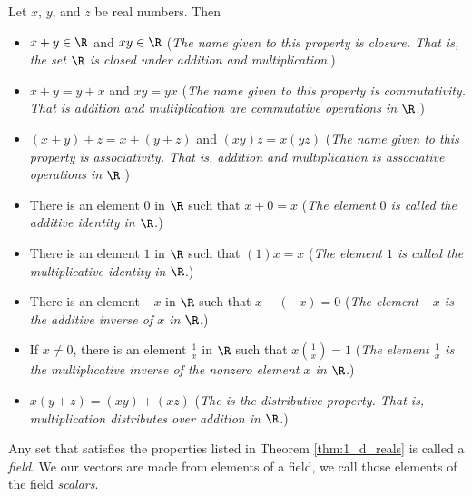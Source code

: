 \begin{theorem} \label{thm:1_d_reals} Let $x$, $y$, and $z$ be real numbers. Then
\begin{itemize}
\item $x + y \in \R$ and $xy \in \R$ (\emph{The name given to this property is closure. That is, the set $\R$ is closed under addition and multiplication.})
\item $x + y = y + x$ and $xy=yx$ (\emph{The name given to this property is commutativity. That is addition and multiplication are commutative operations in $\R$.})
\item $(x + y) + z = x + (y + z)$ and $(xy)z = x(yz)$ (\emph{The name given to this property is associativity. That is, addition and multiplication is associative operations in $\R$.})
\item There is an element $0$ in $\R$ such that $x+ 0 = x$ (\emph{The element $0$ is called the  additive identity in $\R$.}) 
\item There is an element $1$ in $\R$ such that $(1)x = x$ (\emph{The element $1$ is called the  multiplicative identity in $\R$.}) 
\item There is an element $-x$ in $\R$ such that $x+(-x) = 0$ (\emph{The element $-x$ is the additive inverse of $x$ in $\R$.}) 
\item If $x \neq 0$, there is an element $\frac{1}{x}$ in $\R$ such that $x\left(\frac{1}{x}\right) = 1$ (\emph{The element $\frac{1}{x}$ is the multiplicative inverse of the nonzero element $x$ in $\R$.}) 
\item $x (y + z) = (x y) + (x z)$ (\emph{The is the distributive property. That is, multiplication distributes over addition in $\R$.}) 
\end{itemize}
\end{theorem}
Any set that satisfies the properties listed in Theorem  \ref{thm:1_d_reals} is called a \emph{field}. We our vectors are made from elements of a field, we call those elements of the field \emph{scalars}. 


